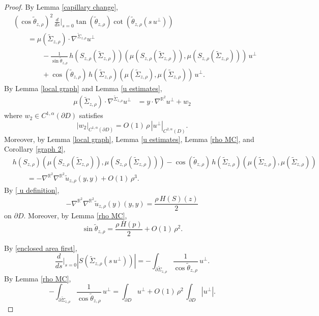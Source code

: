 \documentclass[11pt]{amsart}
\begin{document}
\begin{proof}
	By Lemma \ref{capillary change},
	\begin{align*} 
		&(\cos\tilde \theta_{z,\rho})^2\,\frac{d}{ds}\bigg|_{s=0}\tan(\tilde \theta_{z,\rho})\cot(\tilde \theta_{z,\rho}(s\,u^\perp))
		\\&\qquad =\mu(\tilde \Sigma_{z,\rho})\cdot\nabla^{\tilde \Sigma_{z,\rho}}u^\perp
		\\&\qquad \qquad -\frac{1}{\sin\tilde \theta_{z,\rho}}\,h(S_{z,\rho}(\tilde \Sigma_{z,\rho}))(\mu(S_{z,\rho}(\tilde \Sigma_{z,\rho})),\mu(S_{z,\rho}(\tilde \Sigma_{z,\rho})))\,u^\perp
		\\&\qquad\qquad+\cos(\tilde \theta_{z,\rho})\,h(\tilde \Sigma_{z,\rho})(\mu(\tilde \Sigma_{z,\rho}),\mu(\tilde \Sigma_{z,\rho}))\, u^\perp.
	\end{align*} 
	By Lemma \ref{local graph} and Lemma \ref{u estimates},
	\begin{align*} 
	\mu(\tilde \Sigma_{z,\rho})\cdot	\nabla^{\tilde \Sigma_{z,\rho}} u^\perp &=y\cdot \nabla^{\mathbb{R}^2} u^\perp+w_2
		\end{align*}
			where $w_2\in C^{1,\alpha}(\partial D)$ satisfies 
		$$
		|w_2|_{C^{1,\alpha}(\partial D)}=O(1)\,\rho\,|u^\perp|_{C^{2,\alpha}(D)}.
		$$ 
		Moreover, by Lemma \ref{local graph}, Lemma \ref{u estimates}, Lemma \ref{rho MC}, and Corollary  \ref{graph 2},
		\begin{align*} 
&h(S_{z,\rho})(\mu(S_{z,\rho}(\tilde \Sigma_{z,\rho})),\mu(S_{z,\rho}(\tilde \Sigma_{z,\rho})))
-\cos(\tilde \theta_{z,\rho})\,h(\tilde \Sigma_{z,\rho})(\mu(\tilde \Sigma_{z,\rho}),\mu(\tilde \Sigma_{z,\rho}))
\\&\qquad =- 
\nabla^{\mathbb{R}^2}\nabla^{\mathbb{R}^2}\tilde u_{z,\rho}(y,y)+O(1)\,\rho^3.
	\end{align*} 
	By  \eqref{ u definition}, 
	$$
	- \nabla^{\mathbb{R}^2}\nabla^{\mathbb{R}^2}\tilde u_{z,\rho}(y)(y,y)=\frac{\rho\,H(S)(z)}{2}
	$$
	on $\partial D$. Moreover,	by Lemma \ref{rho MC},
	$$
\sin\tilde \theta_{z,\rho}=\frac{\rho\,H(p)}{2}+O(1)\,\rho^2.
	$$
	
By \eqref{enclosed area first},
$$\frac{d}{ds}\bigg|_{s=0} |S(\tilde \Sigma_{{z,\rho}}(s\,u^\perp))|=-\int_{\partial \tilde \Sigma_{z,\rho}}\frac{1}{\cos\tilde \theta_{z,\rho}}\, u^\perp. $$
	By Lemma \ref{rho MC},
	$$
	-\int_{\partial \tilde \Sigma_{z,\rho}}\frac{1}{\cos\tilde \theta_{z,\rho}}\, u^\perp=\int_{\partial D}u^\perp+O(1)\,\rho^2\,\int_{\partial D}|u^\perp|.
	$$
	

\end{proof}
\end{document}
